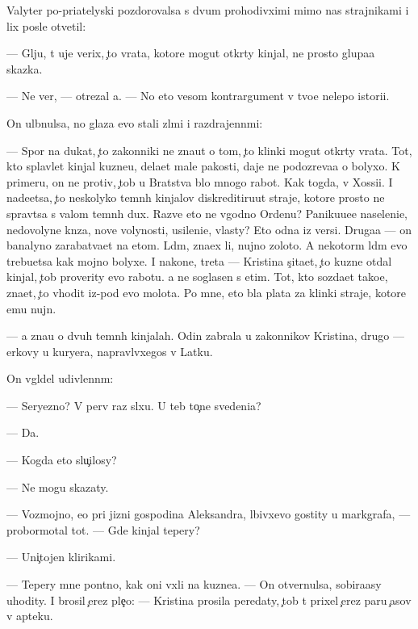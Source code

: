 \documentclass[10pt]{book}
\begin{document}
Valyter po-pri{\y}atelyski pozdorovalsa s dvum{\ia} prohodivximi mimo nas strajnikami i lix posle otvetil:

— Gl{\ia}ju, t{\yi} uje verix, {\c}to vrata, kotor{\yi}{\y}e mogut otkr{\yi}ty kinjal{\yi}, ne prosto glupa{\y}a skazka.

— Ne ver{\iu}, — otrezal {\y}a. — No eto vesom{\yi}{\y} kontrargument v tvo{\y}e{\y} nelepo{\y} istori{\y}i.

On ul{\yi}bnulsa, no glaza {\y}evo stali zl{\yi}mi i razdrajenn{\yi}mi:

— Spor{\iu} na dukat, {\c}to zakonniki ne zna{\y}ut o tom, {\c}to klinki mogut otkr{\yi}ty vrata. Tot, kto splavl{\ia}{\y}et kinjal{\yi} kuzne{\q}u, dela{\y}et mal{\yi}{\y}e pakosti, daje ne podozreva{\y}a o bolyxo{\y}. K primeru, on ne protiv, {\c}tob{\yi} u Bratstva b{\yi}lo mnogo rabot{\yi}. Kak togda, v Xossi{\y}i. I nade{\y}etsa, {\c}to neskolyko temn{\yi}h kinjalov diskreditiru{\y}ut straje{\y}, kotor{\yi}{\y}e prosto ne sprav{\ia}tsa s valom temn{\yi}h dux. Razve eto ne v{\yi}godno Ordenu? Paniku{\y}u{\x}e{\y}e naseleni{\y}e, nedovolyn{\yi}{\y}e kn{\ia}z{\y}a, nov{\yi}{\y}e volynosti, usileni{\y}e, vlasty? Eto odna iz versi{\y}. Druga{\y}a — on banalyno zarabat{\yi}va{\y}et na etom. L{\iu}d{\ia}m, zna{\y}ex li, nujno zoloto. A nekotor{\yi}m l{\iu}d{\ia}m {\y}evo trebu{\y}etsa kak mojno bolyxe. I nakone{\q}, tret{\y}a — Kristina s{\c}ita{\y}et, {\c}to kuzne{\q} otdal kinjal, {\c}tob{\yi} proverity {\y}evo rabotu. {\Y}a ne soglasen s etim. Tot, kto sozda{\y}et tako{\y}e, zna{\y}et, {\c}to v{\yi}hodit iz-pod {\y}evo molota. Po mne, eto b{\yi}la plata za klinki straje{\y}, kotor{\yi}{\y}e {\y}emu nujn{\yi}.

— {\Y}a zna{\y}u o dvuh temn{\yi}h kinjalah. Odin zabrala u zakonnikov Kristina, drugo{\y} — {\q}erkovy u kuryera, napravl{\ia}vxegos{\ia} v Latku.

On v{\yi}gl{\ia}del udivlenn{\yi}m:

— Seryezno? V perv{\yi}{\y} raz sl{\yi}xu. U teb{\ia} to{\c}n{\yi}{\y}e svedeni{\y}a?

— Da.

— Kogda eto slu{\c}ilosy?

— Ne mogu skazaty.

— Vozmojno, {\y}e{\x}o pri jizni gospodina Aleksandra, l{\iu}bivxevo gostity u markgrafa, — probormotal tot. — Gde kinjal tepery?

— Uni{\c}tojen klirikami.

— Tepery mne pon{\ia}tno, kak oni v{\yi}xli na kuzne{\q}a. — On otvernulsa, sobira{\y}asy uhodity. I brosil {\c}erez ple{\c}o: — Kristina prosila peredaty, {\c}tob{\yi} t{\yi} prixel {\c}erez paru {\c}asov v apteku.
\end{document}

